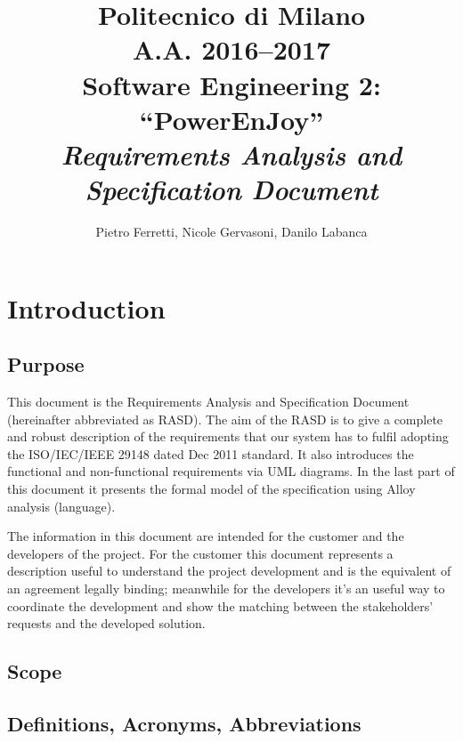 \documentclass[english]{article}
\begin{document}
\title{Politecnico di Milano\\
 A.A. 2016–2017 \\
Software Engineering 2: “PowerEnJoy” \\
\emph{Requirements Analysis and Specification Document}}

\author{Pietro Ferretti, Nicole Gervasoni, Danilo Labanca}

\maketitle
\newpage{}

\tableofcontents{}

\newpage{}

\section{Introduction}

\subsection{Purpose}

This document is the Requirements Analysis and Specification Document
(hereinafter abbreviated as RASD). The aim of the RASD is to give
a complete and robust description of the requirements that our system
has to fulfil adopting the ISO/IEC/IEEE 29148 dated Dec 2011 standard.
It also introduces the functional and non-functional requirements
via UML diagrams. In the last part of this document it presents the
formal model of the specification using Alloy analysis (language). 

The information in this document are intended for the customer and
the developers of the project. For the customer this document represents
a description useful to understand the project development and is
the equivalent of an agreement legally binding; meanwhile for the
developers it’s an useful way to coordinate the development and show
the matching between the stakeholders’ requests and the developed
solution.

\subsection{Scope}

\subsection{Definitions, Acronyms, Abbreviations}
\end{document}
